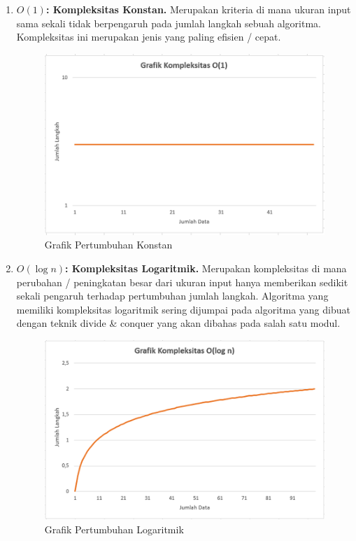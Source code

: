 \begin{enumerate}
    \item \textbf{$O (1)$: Kompleksitas Konstan.} Merupakan kriteria di mana ukuran input sama sekali tidak berpengaruh pada jumlah langkah sebuah algoritma. Kompleksitas ini merupakan jenis yang paling efisien / cepat.
        
    \begin{figure}
        \centering
        \includegraphics[width=\textwidth]{fig/ConstantGrowth}
        \caption{Grafik Pertumbuhan Konstan}
        \label{fig:ConstantGrowth}
    \end{figure}

    \FloatBarrier

    \item \textbf{$O (\log n)$: Kompleksitas Logaritmik.} Merupakan kompleksitas di mana perubahan / peningkatan besar dari ukuran input hanya memberikan sedikit sekali pengaruh terhadap pertumbuhan jumlah langkah. Algoritma yang memiliki kompleksitas logaritmik sering dijumpai pada algoritma yang dibuat dengan teknik divide \& conquer yang akan dibahas pada salah satu modul.

    \begin{figure}
        \centering
        \includegraphics[width=\textwidth]{fig/LogarithmicGrowth}
        \caption{Grafik Pertumbuhan Logaritmik}
        \label{fig:LogarithmicGrowth}
    \end{figure}


\end{enumerate}
